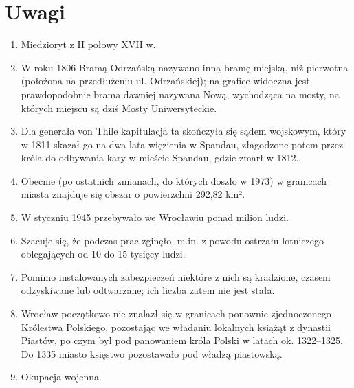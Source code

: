 \documentclass{article}
\begin{document}
\section{Uwagi}
\begin{enumerate}[label=\alph*.]
\item  Miedzioryt z II połowy XVII w.\label{a}
\item  W roku 1806 Bramą Odrzańską nazywano inną bramę miejską, niż pierwotna (położona na przedłużeniu ul. Odrzańskiej); na grafice widoczna jest prawdopodobnie brama dawniej nazywana Nową, wychodząca na mosty, na których miejscu są dziś Mosty Uniwersyteckie.\label{b}
\item Dla generała von Thile kapitulacja ta skończyła się sądem wojskowym, który w 1811 skazał go na dwa lata więzienia w Spandau, złagodzone potem przez króla do odbywania kary w mieście Spandau, gdzie zmarł w 1812.\label{c}
\item Obecnie (po ostatnich zmianach, do których doszło w 1973) w granicach miasta znajduje się obszar o powierzchni 292,82 km².\label{d}
\item W styczniu 1945 przebywało we Wrocławiu ponad milion ludzi.\label{e}
\item Szacuje się, że podczas prac zginęło, m.in. z powodu ostrzału lotniczego oblegających od 10 do 15 tysięcy ludzi.\label{f}
\item Pomimo instalowanych zabezpieczeń niektóre z nich są kradzione, czasem odzyskiwane lub odtwarzane; ich liczba zatem nie jest stała.\label{g}
\item Wrocław początkowo nie znalazł się w granicach ponownie zjednoczonego Królestwa Polskiego, pozostając we władaniu lokalnych książąt z dynastii Piastów, po czym był pod panowaniem króla Polski w latach ok. 1322–1325. Do 1335 miasto księstwo pozostawało pod władzą piastowską.\label{h}
\item Okupacja wojenna. \label{i}

\end{enumerate}
\end{document}
